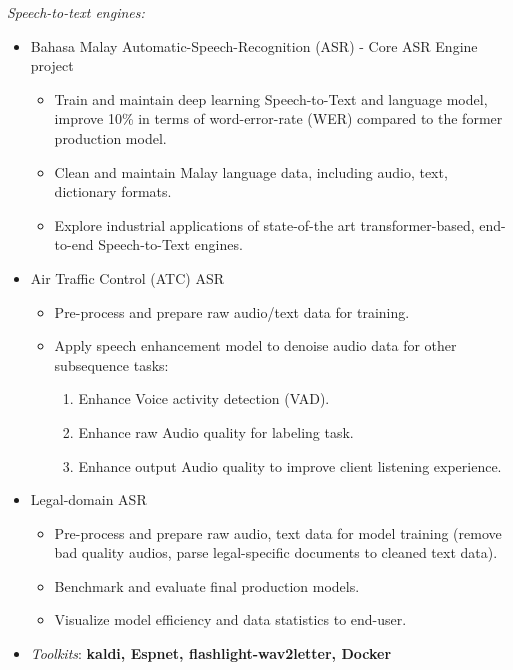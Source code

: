 \documentclass[10pt]{article}
\begin{document}
        \vspace{-5mm}
        \emph{Speech-to-text engines:}
        \vspace{-2.5mm}

        \begin{itemize}[noitemsep]
        \item Bahasa Malay Automatic-Speech-Recognition (ASR) - Core ASR Engine project
            \begin{itemize}[noitemsep]
                \item Train and maintain deep learning Speech-to-Text and language model, improve 10\% in terms of word-error-rate (WER) compared to the former production model.
                \item Clean and maintain Malay language data, including audio, text, dictionary formats.
                \item Explore industrial applications of state-of-the art transformer-based, end-to-end Speech-to-Text engines.
            \end{itemize}
        \item Air Traffic Control (ATC) ASR
            \begin{itemize}[noitemsep]
                \item Pre-process and prepare raw audio/text data for training.
                \item Apply speech enhancement model to denoise audio data for other subsequence tasks:
                    \begin{enumerate}[noitemsep]
                        \item Enhance Voice activity detection (VAD).
                        \item Enhance raw Audio quality for labeling task.
                        \item Enhance output Audio quality to improve client listening experience.
                    \end{enumerate}
            \end{itemize}
        \item Legal-domain ASR
            \begin{itemize}[noitemsep]
                \item Pre-process and prepare raw audio, text data for model training (remove bad quality audios, parse legal-specific documents to cleaned text data).
                \item Benchmark and evaluate final production models.
                \item Visualize model efficiency and data statistics to end-user.
            \end{itemize}
            \item \emph{Toolkits}: \textbf{kaldi, Espnet, flashlight-wav2letter, Docker}
        \end{itemize}
\end{document}
